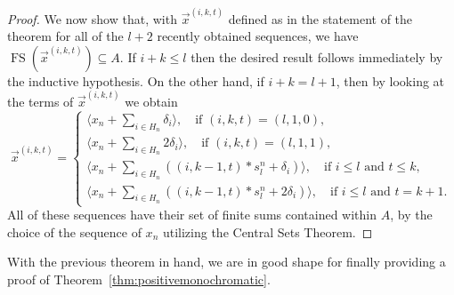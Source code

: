 \documentclass{amsart}
\theoremstyle{definition}
\theoremstyle{remark}
\numberwithin{equation}{section}
\newcommand{\fs}{\mathop{\mathrm{FS}}}
\begin{document}
\begin{proof}
We now show that, with $\vec{x}^{(i,k,t)}$ defined as in the statement of the theorem for all of the $l+2$ recently obtained sequences, we have $\fs(\vec{x}^{(i,k,t)})\subseteq A$. If $i+k\leq l$ then the desired result follows immediately by the inductive hypothesis. On the other hand, if $i+k=l+1$, then by looking at the terms of $\vec{x}^{(i,k,t)}$ we obtain 
\begin{equation*}
\vec{x}^{(i,k,t)}=\begin{cases}
\langle x_n+\sum_{i\in H_n}\delta_i\rangle,\ \ \ \text{ if }(i,k,t)=(l,1,0), \\
\langle x_n+\sum_{i\in H_n}2\delta_i\rangle,\ \ \ \text{ if }(i,k,t)=(l,1,1), \\
\langle x_n+\sum_{i\in H_n}\left((i,k-1,t)*s_l^n+\delta_i\right)\rangle,\ \ \ \text{ if }i\leq l\text{ and }t\leq k, \\
\langle x_n+\sum_{i\in H_n}\left((i,k-1,t)*s_l^n+2\delta_i\right)\rangle,\ \ \ \text{ if }i\leq l\text{ and }t=k+1.
\end{cases}
\end{equation*}
All of these sequences have their set of finite sums contained within $A$, by the choice of the sequence of $x_n$ utilizing the Central Sets Theorem.
\end{proof}

With the previous theorem in hand, we are in good shape for finally providing a proof of Theorem~\ref{thm:positivemonochromatic}.
\end{document}
